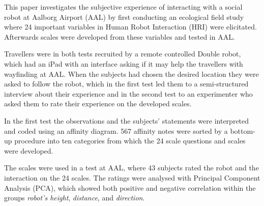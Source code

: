 \label{Abstract}
This paper investigates the subjective experience of interacting with a social robot at Aalborg Airport (AAL) by first conducting an ecological field study where 24 important variables in Human Robot Interaction (HRI) were elicitated. Afterwards scales were developed from these variables and tested in AAL. 

Travellers were in both tests recruited by a remote controlled Double robot, which had an iPad with an interface asking if it may help the travellers with wayfinding at AAL. When the subjects had chosen the desired location they were asked to follow the robot, which in the first test led them to a semi-structured interview about their experience and in the second test to an experimenter who asked them to rate their experience on the developed scales. 


In the first test the observations and the subjects' statements were interpreted and coded using an affinity diagram. 567 affinity notes were sorted by a bottom-up procedure into ten categories from which the 24 scale questions and scales were developed. 

The scales were used in a test at AAL, where 43 subjects rated the robot and the interaction on the 24 scales. The ratings were analysed with Principal Component Analysis (PCA), which showed both positive and negative correlation within the groups \textit{robot's height}, \textit{distance}, and \textit{direction}. 


%
%



